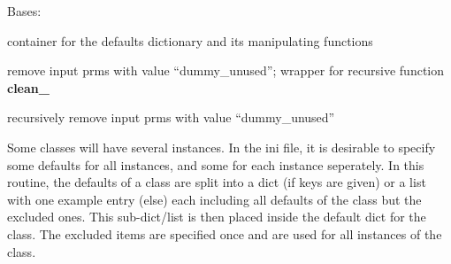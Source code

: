 \documentclass[letterpaper,10pt,english]{sphinxmanual}
\begin{document}
\begin{fulllineitems}
\label{\detokenize{helpers:helpers.default_yml.DefaultFile}}
Bases: 

container for the defaults dictionary and its manipulating
functions

\begin{fulllineitems}
\label{\detokenize{helpers:helpers.default_yml.DefaultFile.clean}}
remove input prms with value “dummy\_unused”;
wrapper for recursive function {\color{red}\bfseries{}clean\_}

\end{fulllineitems}


\begin{fulllineitems}
\label{\detokenize{helpers:helpers.default_yml.DefaultFile.clean_}}
recursively remove input prms with value “dummy\_unused”

\end{fulllineitems}


\begin{fulllineitems}
\label{\detokenize{helpers:helpers.default_yml.DefaultFile.expand_to_several}}
Some classes will have several instances. 
In the ini file, it is desirable to specify some defaults for
all instances, and some for each instance seperately.
In this routine, the defaults of a class are split into a dict
(if keys are given) or a list with one example entry (else)
each including all defaults of the class but the excluded ones. 
This sub-dict/list is then placed inside the default dict for 
the class. The excluded items are specified once and are used
for all instances of the class.


\end{fulllineitems}
\end{fulllineitems}
\end{document}
